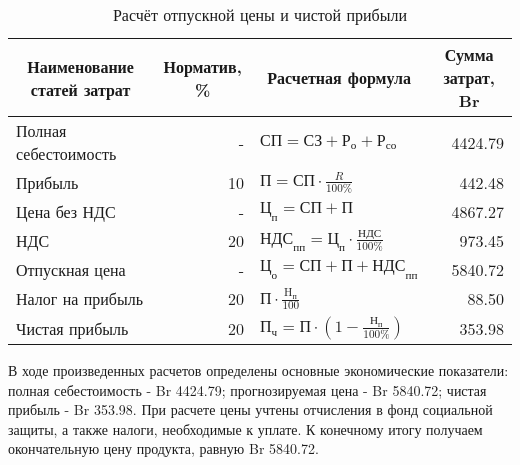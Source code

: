 \begin{table}[ht]
    \centering\small

    \caption{Расчёт отпускной цены и чистой прибыли}
    \label{tab:RaschetOtpusknoiCeniIChistoiPribiliPO}

    \begin{tabular}{|l|r|l|r|}
        \hline
        \multicolumn{1}{|c|}{Наименование статей затрат}
        & \multicolumn{1}{c|}{Норматив, \%}
        & \multicolumn{1}{c|}{Расчетная формула}
        & \multicolumn{1}{c|}{Сумма затрат, Br}
        \\ \hline

        Полная себестоимость& -     & $\text{СП} = \text{СЗ} + \text{Р}_\text{о} + \text{Р}_\text{со}$                  & 4424.79   \\ \hline
        Прибыль             & 10    & $\text{П} = \text{СП} \cdot \frac{ R }{ 100\% }$                                  & 442.48    \\ \hline
        Цена без НДС        & -     & $\text{Ц}_\text{п} = \text{СП} + \text{П}$                                        & 4867.27   \\ \hline
        НДС                 & 20    & $\text{НДС}_\text{пп} = \text{Ц}_\text{п} \cdot \frac{ \text{НДС} }{ 100\% }$     & 973.45    \\ \hline
        Отпускная цена      & -     & $\text{Ц}_\text{о} = \text{СП} + \text{П} + \text{НДС}_\text{пп}$                 & 5840.72   \\ \hline
        Налог на прибыль    & 20    & $\text{П} \cdot \frac{\text{H}_\text{п} }{ 100 }$                                 & 88.50     \\ \hline
        Чистая прибыль      & 20    & $\text{П}_\text{ч} = \text{П} \cdot ( 1 - \frac{ \text{Н}_\text{п} }{ 100\% })$   & 353.98    \\ \hline
    \end{tabular}
\end{table}

В ходе произведенных расчетов определены основные экономические показатели:
полная себестоимость - Br 4424.79;
прогнозируемая цена - Br 5840.72;
чистая прибыль - Br 353.98.
При расчете цены учтены отчисления в фонд социальной защиты, а также налоги, необходимые к уплате.
К конечному итогу получаем окончательную цену продукта, равную Br 5840.72. 
